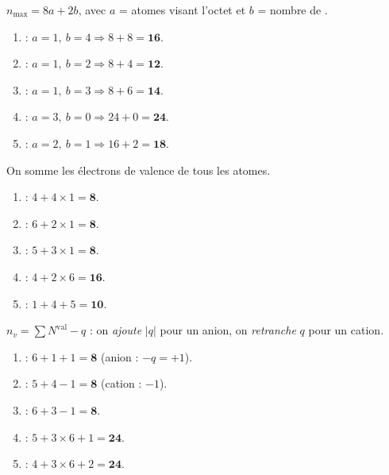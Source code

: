 \documentclass[11pt,a4paper]{article}
\begin{document}
\begin{corrige}
$n_{\max} = 8a + 2b$, avec $a$ = atomes visant l'octet et $b$ = nombre de .
\begin{enumerate}[label=\alph*)]
  \item {} : $a=1,\ b=4 \Rightarrow 8 + 8 = \mathbf{16}$.
  \item {} : $a=1,\ b=2 \Rightarrow 8 + 4 = \mathbf{12}$.
  \item {} : $a=1,\ b=3 \Rightarrow 8 + 6 = \mathbf{14}$.
  \item {} : $a=3,\ b=0 \Rightarrow 24 + 0 = \mathbf{24}$.
  \item {} : $a=2,\ b=1 \Rightarrow 16 + 2 = \mathbf{18}$.
\end{enumerate}
\end{corrige}

\begin{corrige}
On somme les électrons de valence de tous les atomes.
\begin{enumerate}[label=\alph*)]
  \item {} : $4 + 4\times 1 = \mathbf{8}$.
  \item {} : $6 + 2\times 1 = \mathbf{8}$.
  \item {} : $5 + 3\times 1 = \mathbf{8}$.
  \item {} : $4 + 2\times 6 = \mathbf{16}$.
  \item {} : $1 + 4 + 5 = \mathbf{10}$.
\end{enumerate}
\end{corrige}

\begin{corrige}
$n_{v} = \sum N^{\text{val}} - q$ : on \emph{ajoute} $|q|$ pour un anion, on \emph{retranche} $q$
pour un cation.
\begin{enumerate}[label=\alph*)]
  \item {} : $6 + 1 + 1 = \mathbf{8}$ (anion : $-q = +1$).
  \item {} : $5 + 4 - 1 = \mathbf{8}$ (cation : $-1$).
  \item {} : $6 + 3 - 1 = \mathbf{8}$.
  \item {} : $5 + 3\times 6 + 1 = \mathbf{24}$.
  \item {} : $4 + 3\times 6 + 2 = \mathbf{24}$.
\end{enumerate}
\end{corrige}
\end{document}
